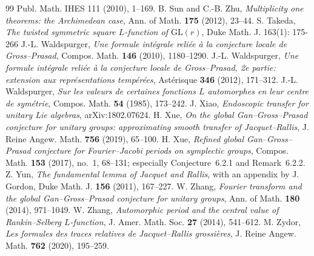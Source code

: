 \documentclass[11pt,oneside,notitlepage]{book}
\numberwithin{equation}{section}
\theoremstyle{plain}
\theoremstyle{definition}
\newcommand{\GL}{\mathrm{GL}}
\begin{document}
\begin{thebibliography}{99}
	Publ. Math. IHES 111 (2010), 1--169.
	 B. Sun and C.-B. Zhu, \emph{Multiplicity one theorems: the Archimedean case}, Ann. of Math. \textbf{175} (2012), 23--44.
		 S. Takeda, \emph{The twisted symmetric square $L$-function of $\GL(r)$}, Duke Math. J. 163(1): 175-266
	 J.-L. Waldspurger, \emph{Une formule int\'egrale reli\'ee \`a la conjecture locale de Gross--Prasad}, Compos. Math. \textbf{146} (2010), 1180--1290.
	 J.-L. Waldspurger, \emph{Une formule int\'egrale reli\'ee \`a la conjecture locale de Gross--Prasad, 2e partie: extension aux repr\'esentations temp\'er\'ees}, Ast\'erisque \textbf{346} (2012), 171--312.
	 J.-L. Waldspurger, \emph{Sur les valeurs de certaines fonctions $L$ automorphes en leur centre de sym\'etrie}, Compos. Math. \textbf{54} (1985), 173--242.
	J. Xiao,
	\emph{Endoscopic transfer for unitary Lie algebras},
	arXiv:1802.07624.
	 H. Xue, \emph{On the global Gan--Gross--Prasad conjecture for unitary groups: approximating smooth transfer of Jacquet--Rallis}, J. Reine Angew. Math. \textbf{756} (2019), 65--100.
	 H. Xue, \emph{Refined global Gan--Gross--Prasad conjecture for Fourier--Jacobi periods on symplectic groups}, Compos. Math. \textbf{153} (2017), no.~1, 68--131; especially Conjecture~6.2.1 and Remark~6.2.2.
	 Z. Yun, \emph{The fundamental lemma of Jacquet and Rallis}, with an appendix by J. Gordon, Duke Math. J. \textbf{156} (2011), 167--227.
	 W. Zhang, \emph{Fourier transform and the global Gan--Gross--Prasad conjecture for unitary groups}, Ann. of Math. \textbf{180} (2014), 971--1049.
	 W. Zhang, \emph{Automorphic period and the central value of Rankin--Selberg $L$-function}, J. Amer. Math. Soc. \textbf{27} (2014), 541--612.
	 M. Zydor, \emph{Les formules des traces relatives de Jacquet--Rallis grossi\`eres}, J. Reine Angew. Math. \textbf{762} (2020), 195--259.
\end{thebibliography}
\end{document}
